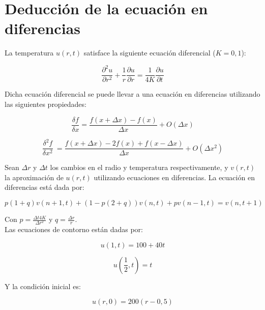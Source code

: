 ﻿\documentclass[%
final,
%
reprint,
%
notitlepage,
narroweqnarray,
inline,
twoside,
invited
]{ieee}
\begin{document}
\section{Deducción de la ecuación en diferencias}

La temperatura $u(r,t)$ satisface la siguiente ecuación diferencial ($K=0,1$):

\begin{equation}
\frac{\partial^2 u}{\partial r^2}+\frac{1}{r}\frac{\partial u}{\partial r}=\frac{1}{4K}\frac{\partial u}{\partial t}
\end{equation}

Dicha ecuación diferencial se puede llevar a una ecuación en diferencias 
utilizando las siguientes propiedades:

\begin{equation}
\frac{\delta f}{\delta x} =  \frac{f(x+\Delta x) - f(x)}{\Delta x} + O(\Delta x)
\end{equation}

\begin{equation}\label{aprox}
\frac{\delta^2 f}{\delta x^2}\ =  \frac{f(x+\Delta x) - 2f(x) + f(x-\Delta x)}{\Delta x} + O(\Delta x^2)
\end{equation}

Sean $\Delta r$ y $\Delta t$ los cambios en el radio y temperatura respectivamente, y $v(r,t)$ la aproximación 
de $u(r,t)$ utilizando ecuaciones en diferencias. La ecuación en diferencias 
está dada por:

\begin{equation}\label{difs}
p(1+q)v(n+1,t) + (1-p(2+q))v(n,t) + pv(n-1,t) = v(n,t+1)
\end{equation}

Con $p=\frac{\Delta t4K}{\Delta r^2}$ y $q=\frac{\Delta r}{r}$. \\



Las ecuaciones de contorno están dadas por:

\begin{equation}
u(1,t) = 100+40t
\end{equation}

\begin{equation}
u(\frac{1}{2}, t) = t
\end{equation}

Y la condición inicial es:

\begin{equation}
u(r,0) = 200(r - 0,5)
\end{equation}
\end{document}
